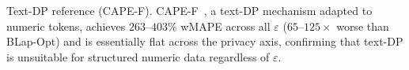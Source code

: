 



\subsubsection{}{Text-DP reference (CAPE-F).} CAPE-F~\cite{wu2025capecontextawarepromptperturbation}, a text-DP mechanism adapted to numeric tokens, achieves $263$--$403\%$ wMAPE across all $\varepsilon$ ($65$--$125\times$ worse than BLap-Opt) and is essentially flat across the privacy axis, confirming that text-DP is unsuitable for structured numeric data regardless of $\varepsilon$.

